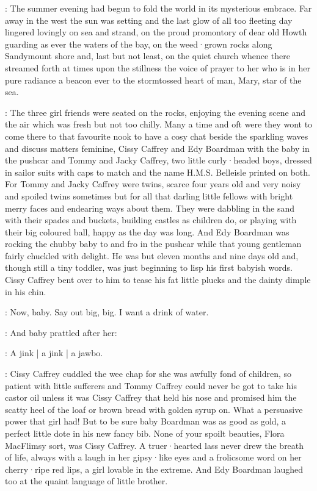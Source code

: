 :
The summer evening
had begun to fold the world
in its mysterious embrace.
Far away in the west
the sun was setting
and the last glow of all too fleeting day
lingered lovingly on sea and strand,
on the proud promontory
of dear old Howth
guarding as ever
the waters of the bay,
on the weed·grown rocks along Sandymount shore
and, last but not least,
on the quiet church
whence there streamed forth at times
upon the stillness
the voice of prayer
to her
who is in her pure radiance
a beacon ever
to the stormtossed heart of man,
Mary,
star of the sea.

:
The three girl friends were seated on the rocks,
enjoying the evening scene
and the air
which was fresh but not too chilly.
Many a time and oft
were they wont to come there
to that favourite nook
to have a cosy chat
beside the sparkling waves
and discuss matters feminine,
Cissy Caffrey
and Edy Boardman with the baby in the pushcar
and Tommy and Jacky Caffrey,
two little curly·headed boys,
dressed in sailor suits
with caps to match
and the name H.M.S. Belleisle printed on both.
For Tommy and Jacky Caffrey were twins,
scarce four years old
and very noisy and spoiled twins sometimes
but for all that
darling little fellows
with bright merry faces and endearing ways about them.
They were dabbling in the sand
with their spades and buckets,
building castles as children do,
or playing with their big coloured ball,
happy as the day was long.
And Edy Boardman was rocking the chubby baby
to and fro in the pushcar
while that young gentleman
fairly chuckled with delight.
He was but eleven months and nine days old
and,
though still a tiny toddler,
was just beginning to lisp his first babyish words.
Cissy Caffrey bent over to him
to tease his fat little plucks
and the dainty dimple in his chin.

\cissy:
Now,
baby.
Say out big,
big.
I want a drink of water.

:
And baby prattled after her:

\baby:
A jink |
a jink |
a jawbo.

:
Cissy Caffrey cuddled the wee chap
for she was awfully fond of children,
so patient with little sufferers
and Tommy Caffrey could never be got to take his castor oil
unless it was Cissy Caffrey that held his nose
and promised him the scatty heel of the loaf
or brown bread with golden syrup on.
What a persuasive power that girl had!
But to be sure
baby Boardman was as good as gold,
a perfect little dote in his new fancy bib.
None of your spoilt beauties,
Flora MacFlimsy sort,
was Cissy Caffrey.
A truer·hearted lass never drew the breath of life,
always with a laugh in her gipsy·like eyes
and a frolicsome word on her cherry·ripe red lips,
a girl lovable in the extreme.
And Edy Boardman laughed too
at the quaint language of little brother.

